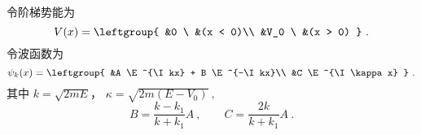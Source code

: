 
\begin{issues}
\issueDraft
\end{issues}

令阶梯势能为
\begin{equation}
V(x) = \leftgroup{
&0 \  &(x < 0)\\
&V_0 \  &(x > 0)
}~.\end{equation}
令波函数为
\begin{equation}
\psi_k(x) = \leftgroup{
&A \E^{\I kx} + B \E^{-\I kx}\\
&C \E^{\I \kappa x}
}~.\end{equation}
其中 $k = \sqrt{2mE}$， $\kappa = \sqrt{2m(E-V_0)}~,$
\begin{equation}
B = \frac{k - k_1}{k + k_1}A~,
\qquad
C = \frac{2k}{k + k_1} A~.
\end{equation}

